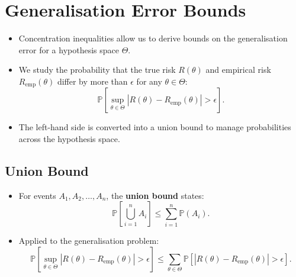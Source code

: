 





\section{Generalisation Error Bounds}


\begin{itemize}
    \item Concentration inequalities allow us to derive bounds on the generalisation error for a hypothesis space $\Theta$.
    \item We study the probability that the true risk $R(\theta)$ and empirical risk $R_{\text{emp}}(\theta)$ differ by more than $\epsilon$ for any $\theta \in \Theta$:
    \[
    \mathbb{P} \left[ \sup_{\theta \in \Theta} |R(\theta) - R_{\text{emp}}(\theta)| > \epsilon \right].
    \]
    \item The left-hand side is converted into a union bound to manage probabilities across the hypothesis space.
\end{itemize}

\subsection{Union Bound}

\begin{itemize}
    \item For events $A_1, A_2, \dots, A_n$, the \textbf{union bound} states:
    \[
    \mathbb{P} \left[ \bigcup_{i=1}^n A_i \right] \leq \sum_{i=1}^n \mathbb{P}(A_i).
    \]
    \item Applied to the generalisation problem:
    \[
    \mathbb{P} \left[ \sup_{\theta \in \Theta} |R(\theta) - R_{\text{emp}}(\theta)| > \epsilon \right] 
    \leq \sum_{\theta \in \Theta} \mathbb{P} \left[ |R(\theta) - R_{\text{emp}}(\theta)| > \epsilon \right].
    \]
\end{itemize}

